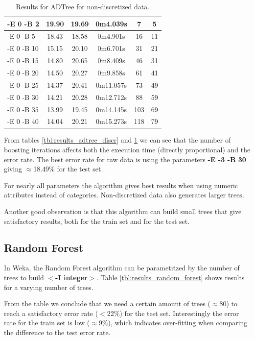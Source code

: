 \documentclass[a4paper]{llncs}
\begin{document}
\begin{table}[ht]
\begin{center}
\begin{tabular}{ | l | c | c | c | c | c |}
    -E 0 -B 2 & 19.90 & 19.69 & 0m4.039s & 7 & 5 \\ \hline
    -E 0 -B 5 & 18.43 & 18.58 & 0m4.901s & 16 & 11 \\ \hline
    -E 0 -B 10 & 15.15 & 20.10 & 0m6.701s & 31 & 21 \\ \hline
    -E 0 -B 15 & 14.80 & 20.65 & 0m8.409s & 46 & 31 \\ \hline
    -E 0 -B 20 & 14.50 & 20.27 & 0m9.858s & 61 & 41 \\ \hline
    -E 0 -B 25 & 14.37 & 20.41 & 0m11.057s & 73 & 49 \\ \hline
    -E 0 -B 30 & 14.21 & 20.28 & 0m12.712s & 88 & 59 \\ \hline
    -E 0 -B 35 & 13.99 & 19.45 & 0m14.145s & 103 & 69 \\ \hline
    -E 0 -B 40 & 14.04 & 20.21 & 0m15.273s & 118 & 79 \\ \hline
    
  \end{tabular}
  \caption{Results for ADTree for non-discretized data.}
  \label{tbl:results_adtree_raw}
  \end{center}
\end{table}

From tables \ref{tbl:results_adtree_discr} and \ref{tbl:results_adtree_raw}
we can see that the number of boosting iterations affects
both the execution time (directly proportional) and the error rate.
The best error rate for raw data is using the parameters \textbf{-E -3 -B 30} giving $\approx$18.49\% for the test set.

For nearly all parameters the algorithm gives best results when using numeric attributes instead
of categories. Non-discretized data also generates larger trees.

Another good observation is that this algorithm can build small trees that give
satisfactory results, both for the train set and for the test set.

\subsection{Random Forest}

In Weka, the Random Forest algorithm can be parametrized by the number
of trees to build \textbf{$<$-I integer$>$}. Table \ref{tbl:results_random_forest} shows results for
a varying number of trees.

From the table we conclude that we need a certain amount of trees ($\approx$80) to
reach a satisfactory error rate ($<$22\%) for the test set. Interestingly
the error rate for the train set is low ($\approx$9\%), which indicates over-fitting
when comparing the difference to the test error rate.
\end{document}
